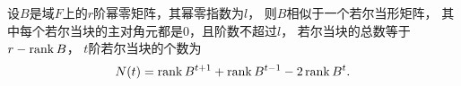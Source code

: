 \begin{corollary}
设\(B\)是域\(F\)上的\(r\)阶幂零矩阵，其幂零指数为\(l\)，
则\(B\)相似于一个若尔当形矩阵，
其中每个若尔当块的主对角元都是\(0\)，且阶数不超过\(l\)，
若尔当块的总数等于\(r - \rank B\)，
\(t\)阶若尔当块的个数为\begin{equation}
	N(t) = \rank B^{t+1} + \rank B^{t-1} - 2 \rank B^t.
\end{equation}
\end{corollary}
